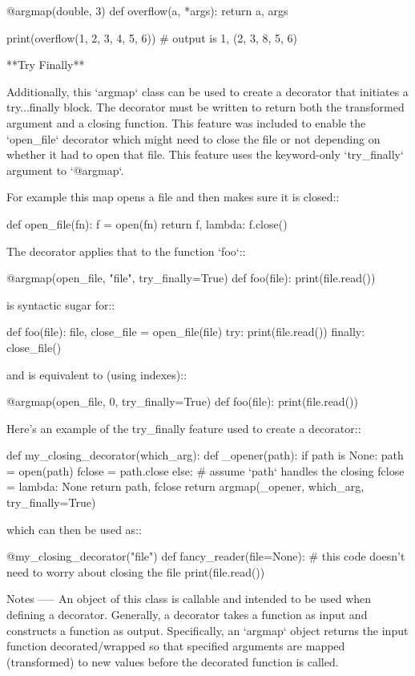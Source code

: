 \begin{DoxyVerb}
    @argmap(double, 3)
    def overflow(a, *args):
        return a, args

    print(overflow(1, 2, 3, 4, 5, 6))  # output is 1, (2, 3, 8, 5, 6)

**Try Finally**

Additionally, this `argmap` class can be used to create a decorator that
initiates a try...finally block. The decorator must be written to return
both the transformed argument and a closing function.
This feature was included to enable the `open_file` decorator which might
need to close the file or not depending on whether it had to open that file.
This feature uses the keyword-only `try_finally` argument to `@argmap`.

For example this map opens a file and then makes sure it is closed::

    def open_file(fn):
        f = open(fn)
        return f, lambda: f.close()

The decorator applies that to the function `foo`::

    @argmap(open_file, "file", try_finally=True)
    def foo(file):
        print(file.read())

is syntactic sugar for::

    def foo(file):
        file, close_file = open_file(file)
        try:
            print(file.read())
        finally:
            close_file()

and is equivalent to (using indexes)::

    @argmap(open_file, 0, try_finally=True)
    def foo(file):
        print(file.read())

Here's an example of the try_finally feature used to create a decorator::

    def my_closing_decorator(which_arg):
        def _opener(path):
            if path is None:
                path = open(path)
                fclose = path.close
            else:
                # assume `path` handles the closing
                fclose = lambda: None
            return path, fclose
        return argmap(_opener, which_arg, try_finally=True)

which can then be used as::

    @my_closing_decorator("file")
    def fancy_reader(file=None):
        # this code doesn't need to worry about closing the file
        print(file.read())

Notes
-----
An object of this class is callable and intended to be used when
defining a decorator. Generally, a decorator takes a function as input
and constructs a function as output. Specifically, an `argmap` object
returns the input function decorated/wrapped so that specified arguments
are mapped (transformed) to new values before the decorated function is called.


\end{DoxyVerb}
